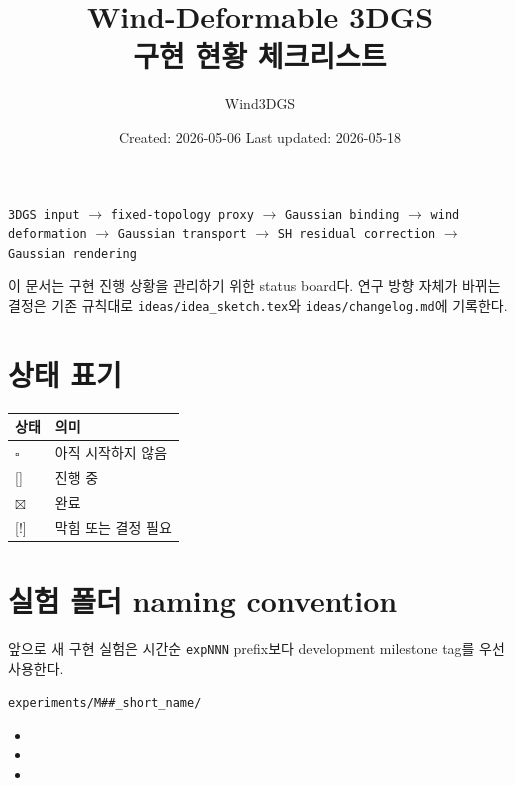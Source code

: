 \documentclass[10pt]{article}
\title{\vspace{-1.5em}Wind-Deformable 3DGS\\구현 현황 체크리스트}
\author{Wind3DGS}
\date{Created: 2026-05-06 \quad Last updated: 2026-05-18}
\newcommand{\todo}{\textcolor{TodoGray}{\(\square\)}}
\newcommand{\progress}{\textcolor{ProgressBlue}{[{\raisebox{0.1ex}{\(\sim\)}}]}}
\newcommand{\done}{\textcolor{DoneGreen}{\(\boxtimes\)}}
\newcommand{\blocked}{\textcolor{BlockRed}{[!]}}
\newcommand{\code}[1]{\texttt{#1}}
\begin{document}
\maketitle

\begin{tcolorbox}[
  colback=LightBlue,
  colframe=blue!45!black,
  title=Development Pipeline,
  fonttitle=\bfseries
]
\begin{center}
\code{3DGS input}
\(\rightarrow\)
\code{fixed-topology proxy}
\(\rightarrow\)
\code{Gaussian binding}
\(\rightarrow\)
\code{wind deformation}
\(\rightarrow\)
\code{Gaussian transport}
\(\rightarrow\)
\code{SH residual correction}
\(\rightarrow\)
\code{Gaussian rendering}
\end{center}

이 문서는 구현 진행 상황을 관리하기 위한 status board다. 연구 방향 자체가 바뀌는 결정은 기존 규칙대로 \code{ideas/idea\_sketch.tex}와 \code{ideas/changelog.md}에 기록한다.
\end{tcolorbox}

\section*{상태 표기}

\begin{center}
\begin{tabular}{@{}ll@{}}
\toprule
상태 & 의미 \\
\midrule
\todo & 아직 시작하지 않음 \\
\progress & 진행 중 \\
\done & 완료 \\
\blocked & 막힘 또는 결정 필요 \\
\bottomrule
\end{tabular}
\end{center}

\section*{실험 폴더 naming convention}

앞으로 새 구현 실험은 시간순 \code{expNNN} prefix보다 development milestone tag를 우선 사용한다.

\begin{tcolorbox}[colback=LightGray, colframe=black!20, title=권장 형식, fonttitle=\bfseries]
\begin{center}
\code{experiments/M\#\#\_short\_name/}
\end{center}

\begin{itemize}
  \item {}
  \item {}
  \item {}
\end{itemize}
\end{tcolorbox}
\end{document}
